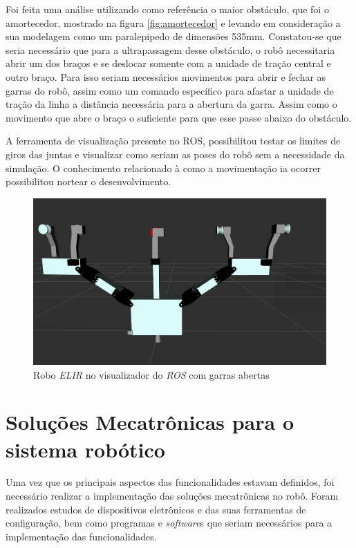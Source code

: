 Foi feita uma análise utilizando como referência o maior obstáculo, que foi o amortecedor, mostrado na figura \ref{fig:amortecedor} e levando em consideração a sua modelagem como um paralepipedo de dimensões 535mm. Constatou-se que seria necessário que para a ultrapassagem desse obstáculo, o robô necessitaria abrir um dos braços e se deslocar somente com a unidade de tração central e outro braço. Para isso seriam necessários movimentos para abrir e fechar as garras do robô, assim como um comando específico para afastar a unidade de tração da linha a distância necessária para a abertura da garra. Assim como o movimento que abre o braço o suficiente para que esse passe abaixo do obstáculo.

A ferramenta de visualização presente no ROS, possibilitou testar os limites de giros das juntas e visualizar como seriam as poses do robô sem a necessidade da simulação. O conhecimento relacionado à como a movimentação ia ocorrer possibilitou nortear o desenvolvimento.
\begin{figure}[H]
	\centering
	\includegraphics[scale=0.25]{Figures/rviz_garra_aberta.png}
	\caption{Robo \textit{ELIR} no visualizador do \textit{ROS} com garras abertas}
	\label{fig:elir_garras abertas}
\end{figure}
\section{Soluções Mecatrônicas para o sistema robótico}\label{sec:sol_sis}
Uma vez que os principais aspectos das funcionalidades estavam definidos, foi necessário realizar a implementação das soluções mecatrônicas no robô. Foram realizados estudos de dispositivos eletrônicos e das suas ferramentas de configuração, bem como programas e \textit{software}s que seriam necessários para a implementação das funcionalidades.

